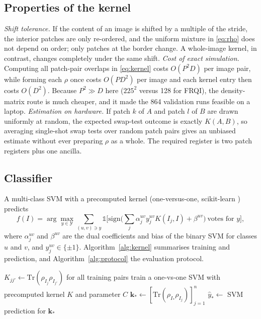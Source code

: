 \documentclass[12pt,onecolumn,draftclsnofoot]{IEEEtran}
\begin{document}
\subsection{Properties of the kernel}
\emph{Shift tolerance.} If the content of an image is shifted by a multiple of the stride, the interior patches are only re-ordered, and the uniform mixture in \eqref{eq:rho} does not depend on order; only patches at the border change. A whole-image kernel, in contrast, changes completely under the same shift.
\emph{Cost of exact simulation.} Computing all patch-pair overlaps in \eqref{eq:kernel} costs $O(P^2D)$ per image pair, while forming each $\rho$ once costs $O(PD^2)$ per image and each kernel entry then costs $O(D^2)$. Because $P^2\gg D$ here ($225^2$ versus 128 for FRQI), the density-matrix route is much cheaper, and it made the 864 validation runs feasible on a laptop.
\emph{Estimation on hardware.} If patch $k$ of $A$ and patch $l$ of $B$ are drawn uniformly at random, the expected swap-test outcome is exactly $K(A,B)$, so averaging single-shot swap tests over random patch pairs gives an unbiased estimate without ever preparing $\rho$ as a whole. The required register is two patch registers plus one ancilla.

\subsection{Classifier}
A multi-class SVM \cite{cortes1995} with a precomputed kernel (one-versus-one, scikit-learn \cite{pedregosa2011}) predicts
\begin{equation}
f(I)=\arg\max_{y\in\mathcal Y}\sum_{(u,v)\ni y}\mathbb 1\Big[\mathrm{sign}\Big(\sum_{j}\alpha^{uv}_jy^{uv}_jK(I_j,I)+\beta^{uv}\Big)\ \text{votes for } y\Big],
\label{eq:svm}
\end{equation}
where $\alpha^{uv}_j$ and $\beta^{uv}$ are the dual coefficients and bias of the binary SVM for classes $u$ and $v$, and $y^{uv}_j\in\{\pm1\}$. Algorithm~\ref{alg:kernel} summarises training and prediction, and Algorithm~\ref{alg:protocol} the evaluation protocol.

\begin{algorithm}[!t]
\caption{Patch-ensemble kernel classifier}
\label{alg:kernel}
$K_{jj'}\leftarrow\mathrm{Tr}(\rho_{I_j}\rho_{I_{j'}})$ for all training pairs\;
train a one-vs-one SVM with precomputed kernel $K$ and parameter $C$\;
$\mathbf k_*\leftarrow[\mathrm{Tr}(\rho_{I_*}\rho_{I_j})]_{j=1}^{n}$\;
$\hat y_*\leftarrow$ SVM prediction for $\mathbf k_*$\;
\end{algorithm}
\end{document}
